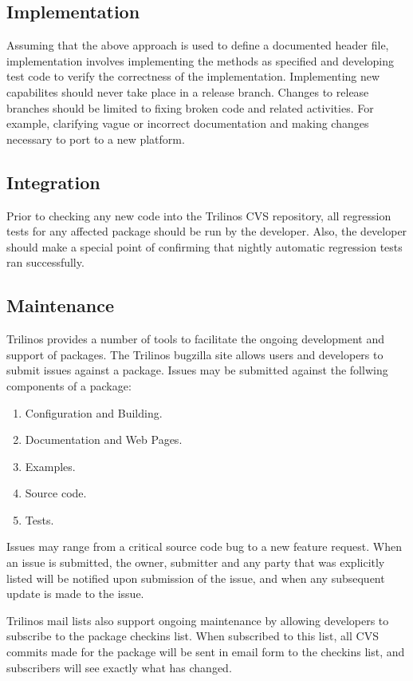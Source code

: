 \documentclass[12pt,relax]{TrilinosDevGuide}
\begin{document}
\subsection{Implementation}
Assuming that the above approach is used to define a documented header
file, implementation involves implementing the methods as specified
and developing test code to verify the correctness of the implementation.
Implementing new capabilites should never take place in a release branch.  
Changes to release branches should be limited to fixing broken code and 
related activities.  For example, clarifying vague or incorrect documentation 
and making changes necessary to port to a new platform.

\subsection{Integration}
Prior to checking any new code into the Trilinos CVS repository, all
regression tests for any affected package should be run by the
developer.  Also, the developer should make a special point of
confirming that nightly automatic regression tests ran successfully.


\subsection{Maintenance}
Trilinos provides a number of tools to facilitate the ongoing
development and support of packages.  The Trilinos bugzilla site
allows users and developers to submit issues against a package.
Issues may be submitted against the follwing components of a package:
\begin{enumerate}
\item Configuration and Building.
\item Documentation and Web Pages.
\item Examples.
\item Source code.
\item Tests.
\end{enumerate}
Issues may range from a critical source code bug to a new feature
request.  When an issue is submitted, the owner, submitter and any
party that was explicitly listed will be notified upon submission of
the issue, and when any subsequent update is made to the issue.

Trilinos mail lists also support ongoing maintenance by allowing
developers to subscribe to the package checkins list.  When subscribed
to this list, all CVS commits made for the package will be sent in
email form to the checkins list, and subscribers will see exactly what
has changed.
\end{document}
